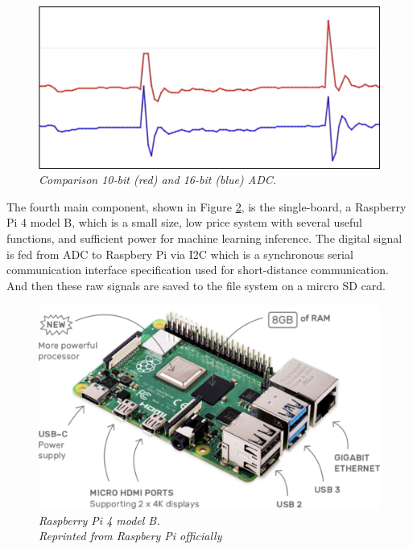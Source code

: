 \begin{figure}[H]
  \centering
  \caption[Comparison 10-bit (red) and 16-bit (blue) ADC.]{\emph{Comparison 10-bit (red) and 16-bit (blue) ADC.}}\label{fig:adc}
  \includegraphics[scale = 0.3]{figures/ADC.jpg}
\end{figure}


The fourth main component, shown in Figure \ref{fig:pi4}, is the single-board, a Raspberry Pi 4 model B, which is a small size, low price system with several useful functions, and sufficient power for machine learning inference. The digital signal is fed from ADC to Raspbery Pi via I2C which is a synchronous serial communication interface specification used for short-distance communication. And then these raw signals are saved to the file system on a mircro SD card.

\begin{figure}[H]
  \centering
  \caption[Raspberry Pi 4 model B.]{\emph{Raspberry Pi 4 model B. \\ Reprinted from Raspbery Pi officially}}\label{fig:pi4}
  \includegraphics[scale = 0.14]{figures/pi4.jpg}
\end{figure}

